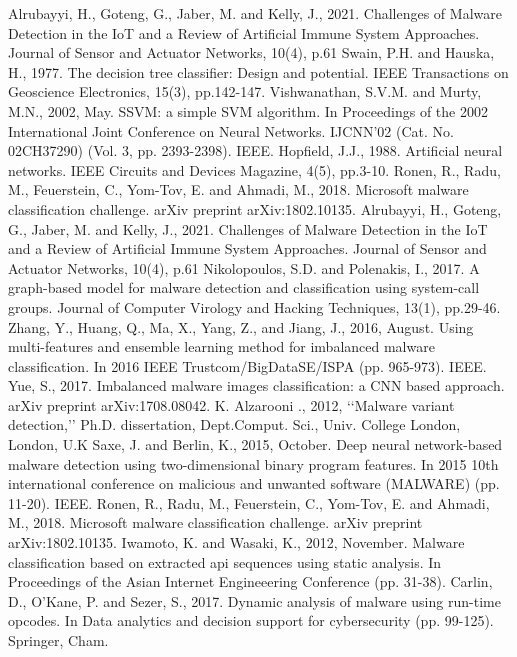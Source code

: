 \documentclass[conference]{IEEEtran}
\begin{document}
\begin{thebibliography}{00}
 Alrubayyi, H., Goteng, G., Jaber, M. and Kelly, J., 2021. Challenges of Malware Detection in the IoT
and a Review of Artificial Immune System Approaches. Journal of Sensor and Actuator Networks, 10(4),
p.61
 Swain, P.H. and Hauska, H., 1977. The decision tree classifier: Design and potential. IEEE Transactions on Geoscience Electronics, 15(3), pp.142-147.
 Vishwanathan, S.V.M. and Murty, M.N., 2002, May. SSVM: a simple SVM algorithm. In Proceedings of the 2002 International Joint Conference on Neural Networks. IJCNN'02 (Cat. No. 02CH37290) (Vol. 3, pp. 2393-2398). IEEE.
 Hopfield, J.J., 1988. Artificial neural networks. IEEE Circuits and Devices Magazine, 4(5), pp.3-10.
 Ronen, R., Radu, M., Feuerstein, C., Yom-Tov, E. and Ahmadi, M., 2018. Microsoft malware classification challenge. arXiv preprint arXiv:1802.10135.
 Alrubayyi, H., Goteng, G., Jaber, M. and Kelly, J., 2021. Challenges of Malware Detection in the IoT and a Review of Artificial Immune System Approaches. Journal of Sensor and Actuator Networks, 10(4), p.61
 Nikolopoulos, S.D. and Polenakis, I., 2017. A graph-based model for malware detection and classification using system-call groups. Journal of Computer Virology and Hacking Techniques, 13(1), pp.29-46.
 Zhang, Y., Huang, Q., Ma, X., Yang, Z., and Jiang, J., 2016, August. Using multi-features and ensemble learning method for imbalanced malware classification. In 2016 IEEE Trustcom/BigDataSE/ISPA (pp. 965-973). IEEE.
 Yue, S., 2017. Imbalanced malware images classification: a CNN based approach. arXiv preprint arXiv:1708.08042.
 K. Alzarooni ., 2012, ‘‘Malware variant detection,’’ Ph.D. dissertation, Dept.Comput. Sci., Univ. College London, London, U.K
 Saxe, J. and Berlin, K., 2015, October. Deep neural network-based malware detection using two-dimensional binary program features. In 2015 10th international conference on malicious and
unwanted software (MALWARE) (pp. 11-20). IEEE.
 Ronen, R., Radu, M., Feuerstein, C., Yom-Tov, E. and Ahmadi, M., 2018. Microsoft malware classification challenge. arXiv preprint arXiv:1802.10135.
 Iwamoto, K. and Wasaki, K., 2012, November. Malware classification based on extracted api sequences using static analysis. In Proceedings of the Asian Internet Engineeering Conference (pp. 31-38).
 Carlin, D., O’Kane, P. and Sezer, S., 2017. Dynamic analysis of malware using run-time opcodes. In Data analytics and decision support for cybersecurity (pp. 99-125). Springer, Cham.

\end{thebibliography}
\end{document}
